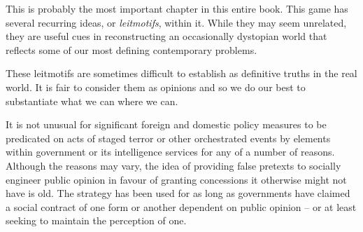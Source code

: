 

This is probably the most important chapter in this entire book. This game has several recurring ideas, or {\it leitmotifs}, within it. While they may seem unrelated, they are useful cues in reconstructing an occasionally dystopian world that reflects some of our most defining contemporary problems. 

These leitmotifs are sometimes difficult to establish as definitive truths in the real world. It is fair to consider them as opinions and so we do our best to substantiate what we can where we can. 

\startitemize[4]

It is not unusual for significant foreign and domestic policy measures to be predicated on acts of staged terror or other orchestrated events by elements within government or its intelligence services for any of a number of reasons. Although the reasons may vary, the idea of providing false pretexts to socially engineer public opinion in favour of granting concessions it otherwise might not have is old. The strategy has been used for as long as governments have claimed a social contract of one form or another dependent on public opinion -- or at least seeking to maintain the perception of one.


